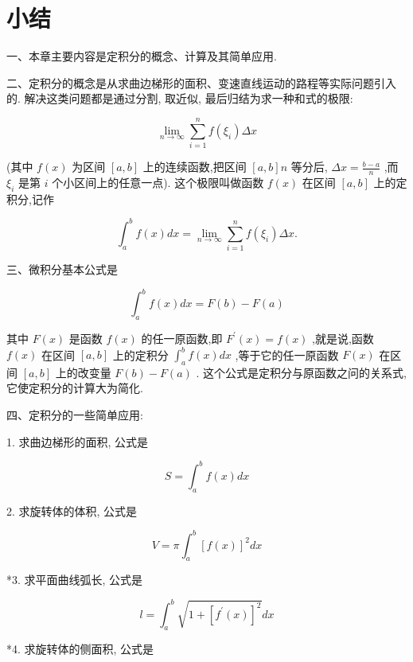 \documentclass[lang=cn,newtx,10pt,scheme=chinese]{elegantbook}
\begin{document}
\chapter*{小结}

一、本章主要内容是定积分的概念、计算及其简单应用.

二、定积分的概念是从求曲边梯形的面积、变速直线运动的路程等实际问题引入的. 解决这类问题都是通过分割, 取近似, 最后归结为求一种和式的极限:

\[
\mathop{\lim }\limits_{{n \rightarrow \infty }}\mathop{\sum }\limits_{{i = 1}}^{n}f\left( {\xi }_{i}\right) {\Delta x}
\]

(其中 \(f\left( x\right)\) 为区间 \(\left\lbrack {a,b}\right\rbrack\) 上的连续函数,把区间 \(\left\lbrack {a,b}\right\rbrack n\) 等分后, \({\Delta x} = \frac{b - a}{n}\) ,而 \({\xi }_{i}\) 是第 \(i\) 个小区间上的任意一点). 这个极限叫做函数 \(f\left( x\right)\) 在区间 \(\left\lbrack {a,b}\right\rbrack\) 上的定积分,记作

\[
{\int }_{a}^{b}f\left( x\right) {dx} = \mathop{\lim }\limits_{{n \rightarrow \infty }}\mathop{\sum }\limits_{{i = 1}}^{n}f\left( {\xi }_{i}\right) {\Delta x}.
\]

三、微积分基本公式是

\[
{\int }_{a}^{b}f\left( x\right) {dx} = F\left( b\right) - F\left( a\right)
\]

其中 \(F\left( x\right)\) 是函数 \(f\left( x\right)\) 的任一原函数,即 \({F}^{\prime }\left( x\right) = f\left( x\right)\) ,就是说,函数 \(f\left( x\right)\) 在区间 \(\left\lbrack {a,b}\right\rbrack\) 上的定积分 \({\int }_{a}^{b}f\left( x\right) {dx}\) ,等于它的任一原函数 \(F\left( x\right)\) 在区间 \(\left\lbrack {a,b}\right\rbrack\) 上的改变量 \(F\left( b\right) - F\left( a\right)\) . 这个公式是定积分与原函数之问的关系式, 它使定积分的计算大为简化.

四、定积分的一些简单应用:

1. 求曲边梯形的面积, 公式是

\[
S = {\int }_{a}^{b}f\left( x\right) {dx}
\]

2. 求旋转体的体积, 公式是

\[
V = \pi {\int }_{a}^{b}{\left\lbrack f\left( x\right) \right\rbrack }^{2}{dx}
\]

*3. 求平面曲线弧长, 公式是

\[
l = {\int }_{a}^{b}\sqrt{1 + {\left\lbrack {f}^{\prime }\left( x\right) \right\rbrack }^{2}}{dx}
\]

*4. 求旋转体的侧面积, 公式是
\end{document}
